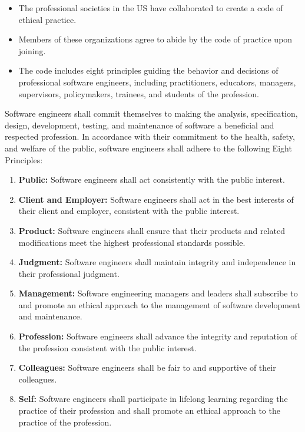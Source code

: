 \documentclass{report}
\begin{document}
\begin{itemize}
\begin{itemize}[noitemsep]
                \item The professional societies in the US have collaborated to create a code of ethical practice.
                \item Members of these organizations agree to abide by the code of practice upon joining.
                \item The code includes eight principles guiding the behavior and decisions of professional software engineers, including practitioners, educators, managers, supervisors, policymakers, trainees, and students of the profession.
            \end{itemize}
            Software engineers shall commit themselves to making the analysis, specification, design, development, testing, and maintenance of software a beneficial and respected profession. 
            \bigbreak \noindent 
            In accordance with their commitment to the health, safety, and welfare of the public, software engineers shall adhere to the following Eight Principles:
            \begin{enumerate}[noitemsep]
                \item \textbf{Public:} Software engineers shall act consistently with the public interest.
                \item \textbf{Client and Employer:} Software engineers shall act in the best interests of their client and employer, consistent with the public interest.
                \item \textbf{Product:} Software engineers shall ensure that their products and related modifications meet the highest professional standards possible.
                \item \textbf{Judgment:} Software engineers shall maintain integrity and independence in their professional judgment.
                \item \textbf{Management:} Software engineering managers and leaders shall subscribe to and promote an ethical approach to the management of software development and maintenance.
                \item \textbf{Profession:} Software engineers shall advance the integrity and reputation of the profession consistent with the public interest.
                \item \textbf{Colleagues:} Software engineers shall be fair to and supportive of their colleagues.
                \item \textbf{Self:} Software engineers shall participate in lifelong learning regarding the practice of their profession and shall promote an ethical approach to the practice of the profession.
            \end{enumerate}




    \end{itemize}
\end{document}
